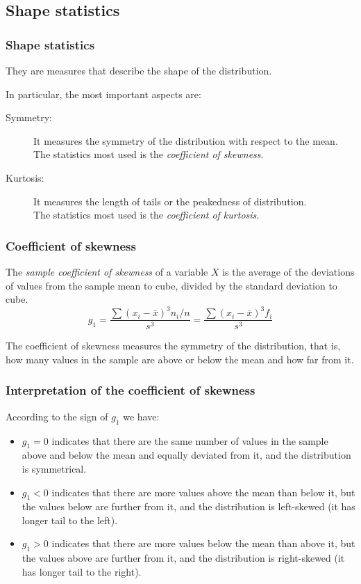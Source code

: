 \subsection{Shape statistics}
\begin{frame}
\frametitle{Shape statistics}
They are measures that describe the shape of the distribution. 

In particular, the most important aspects are:
\begin{description}
\item[Symmetry:] It measures the symmetry of the distribution with respect to the mean. \\
The statistics most used is the \emph{coefficient of skewness}.
\item[Kurtosis:] It measures the length of tails or the peakedness of distribution. \\
The statistics most used is the \emph{coefficient of kurtosis}.
\end{description}
\end{frame}


\begin{frame}
\frametitle{Coefficient of skewness}
\begin{definition}
The \emph{sample coefficient of skewness} of a variable $X$ is the average of the deviations of values from the sample
mean to cube, divided by the standard deviation to cube. 
\[
g_1 = \frac{\sum (x_i-\bar x)^3 n_i/n}{s^3} = \frac{\sum (x_i-\bar x)^3 f_i}{s^3}
\]
\end{definition}

The coefficient of skewness measures the symmetry of the distribution, that is, how many values in the sample are above or below the mean and how far from it. 
\end{frame}


\begin{frame}
\frametitle{Interpretation of the coefficient of skewness}

According to the sign of $g_1$ we have:
\begin{itemize}
\item $g_1=0$ indicates that there are the same number of values in the sample above and below the mean and equally deviated from it, and the distribution is symmetrical.
\item $g_1<0$ indicates that there are more values above the mean than below it, but the values below are further from it, and the distribution is left-skewed (it has longer tail to the left). 
\item $g_1>0$ indicates that there are more values below the mean than above it, but the values above are further from it, and the distribution is right-skewed (it has longer tail to the right).  
\end{itemize}
\end{frame}
  
